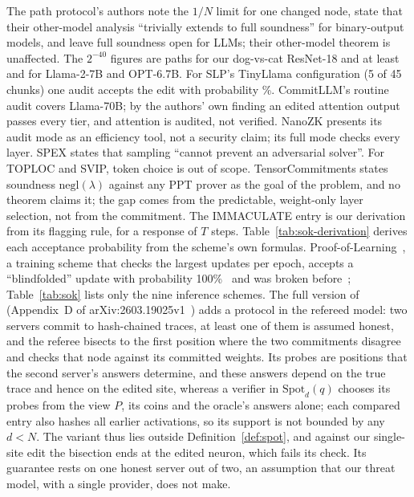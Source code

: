  The path protocol's authors note the $1/N$ limit
for one changed node, state that their other-model analysis ``trivially extends to full
soundness'' for binary-output models, and leave full soundness open for LLMs; their other-model
theorem is unaffected. The $2^{-40}$ figures are \CnnPathsResNet{} paths for our dog-vs-cat ResNet-18 and at
least \PathsLlama{} and \AttackOptLPaths{} for Llama-2-7B and OPT-6.7B. For SLP's TinyLlama configuration (5 of
45 chunks) one audit accepts the edit with probability \SokSlpTiny{}\%. CommitLLM's routine audit covers
Llama-70B; by the authors' own finding an edited attention output passes every tier, and attention
is audited, not verified. NanoZK presents its audit mode as an efficiency tool, not a security
claim; its full mode checks every layer. SPEX states that sampling ``cannot prevent an adversarial
solver''. For TOPLOC and SVIP, token choice is out of scope. TensorCommitments states soundness
$\mathrm{negl}(\lambda)$ against any PPT prover as the goal of the problem, and no theorem claims
it; the gap comes from the predictable, weight-only layer selection, not from the commitment. The
IMMACULATE entry is our derivation from its flagging rule, for a response of $T$ steps.
Table~\ref{tab:sok-derivation} derives each acceptance probability from the scheme's own formulas.
Proof-of-Learning~\cite{jia2021pol}, a training scheme that checks the largest updates per epoch,
accepts a ``blindfolded'' update with probability 100\%~\cite{fang2023pol} and was broken
before~\cite{zhang2022pol,fang2023pol}; Table~\ref{tab:sok} lists only the nine inference schemes.
The full version of~\cite{anchuri2026verifiable} (Appendix~D of arXiv:2603.19025v1~\cite{anchuri2026full}) adds a
protocol in the refereed model: two servers commit to hash-chained traces, at least one of them is
assumed honest, and the referee bisects to the first position where the two commitments disagree
and checks that node against its committed weights. Its probes are positions that the second
server's answers determine, and these answers depend on the true trace and hence on the edited
site, whereas a verifier in $\mathrm{Spot}_d(q)$ chooses its probes from the view $P$, its coins
and the oracle's answers alone; each compared entry also hashes all earlier activations, so its
support is not bounded by any $d<N$. The variant thus lies outside Definition~\ref{def:spot}, and
against our single-site edit the bisection ends at the edited neuron, which fails its check. Its
guarantee rests on one honest server out of two, an assumption that our threat model, with a
single provider, does not make.

